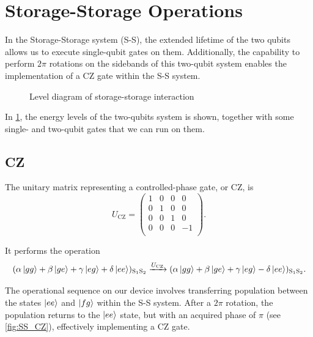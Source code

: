 
\section{Storage-Storage Operations}
\label{sec:S-S}

In the Storage-Storage system (S-S), the extended lifetime of the two qubits allows us to execute single-qubit gates on them.
Additionally, the capability to perform $2\pi$ rotations on the sidebands of this two-qubit system enables the implementation of a CZ gate within the S-S system.

\begin{figure}[b]
    \centering
    
    \vspace{-1cm}
    \caption{Level diagram of storage-storage interaction}
    \label{fig:SS_level}
\end{figure}

In \cref{fig:SS_level}, the energy levels of the two-qubits system is shown, together with some single- and two-qubit gates that we can run on them.

\subsection{CZ}

The unitary matrix representing a controlled-phase gate, or CZ, is
\begin{equation}
    U_{\text{CZ}} = 
    \begin{pmatrix}
    1 & 0 & 0 & 0 \\
    0 & 1 & 0 & 0 \\
    0 & 0 & 1 & 0 \\
    0 & 0 & 0 & -1 \\
\end{pmatrix}.
\end{equation}

It performs the operation
\begin{equation}
    (\alpha \ket{gg} + \beta \ket{ge} + \gamma \ket{eg} + \delta \ket{ee})_{\text{S}_1 \text{S}_2} \xrightarrow{U_{\text{CZ}}}
    (\alpha \ket{gg} + \beta \ket{ge} + \gamma \ket{eg} - \delta \ket{ee})_{\text{S}_1 \text{S}_2} . 
\end{equation}

The operational sequence on our device involves transferring population between the states $\ket{ee}$ and $\ket{fg}$ within the S-S system.
After a $2\pi$ rotation, the population returns to the $\ket{ee}$ state, but with an acquired phase of $\pi$ (see \cref{fig:SS_CZ}), effectively implementing a CZ gate.

